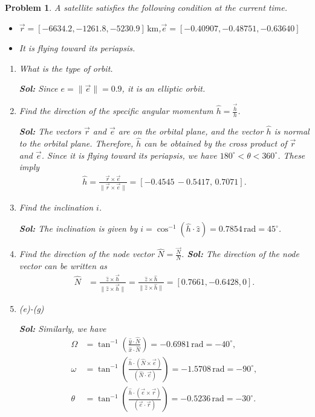\documentclass[10pt]{article}
\newcommand{\parenth}[1]{\ensuremath{\left( #1 \right)}}
\theoremstyle{plain}\theorembodyfont{\normalfont}
\newtheorem{prob}{Problem}[section]
\newenvironment{subprob}%
{\renewcommand{\theenumi}{\alph{enumi}}\renewcommand{\labelenumi}{(\theenumi)}\begin{enumerate}}%
{\end{enumerate}}%
\begin{document}
\newpage
\begin{prob} A satellite satisfies the following condition at the current time.
\begin{itemize}
\item $\vec r = [-6634.2, -1261.8, -5230.9]\,\mathrm{km}$,\quad $\vec e = [-0.40907, -0.48751, -0.63640]$
\item It is flying toward its periapsis.
\end{itemize}
\begin{subprob}
\item What is the type of orbit.

\textbf{Sol:} Since $e=\|\vec e\|= 0.9 $, it is an elliptic orbit.

\item Find the direction of the specific angular momentum $\hat h = \frac{\vec h}{h}$.

\textbf{Sol:} The vectors $\vec r$ and $\vec e$ are on the orbital plane, and the vector $\hat h$ is normal to the orbital plane. Therefore, $\hat h$ can be obtained by the cross product  of $\vec r$ and $\vec e$. Since it is flying toward its periapsis, we have $180^\circ < \theta <360^\circ$. These imply
\begin{align*}
\hat h = \frac{\vec r \times \vec e}{\|\vec r \times \vec e\|} = 
[-0.4545\,   -0.5417,\,    0.7071].
\end{align*}

\item Find the inclination $i$. %

\textbf{Sol:} The inclination is given by $i = \cos^{-1} (\hat h \cdot \hat z) = 0.7854\,\mathrm{rad}=45^\circ$.

\item Find the direction of the node vector $\hat N = \frac{\vec N}{N}$.
\textbf{Sol:} The direction of the node vector can be written as
\begin{align*}
\hat N & = \frac{\hat z \times \vec h}{\|\hat z \times \vec h\|} = 
\frac{\hat z \times \hat h}{\|\hat z \times \hat h\|} = [0.7661,   -0.6428,         0].
\end{align*}

\item[(e)-(g)]

\textbf{Sol:} Similarly, we have
\begin{align*}
\Omega & = \tan^{-1} \parenth{\frac{\hat y \cdot \hat N}{\hat x \cdot \hat N}}=-0.6981\,\mathrm{rad}=-40^\circ,\\
\omega & = \tan^{-1} \parenth{\frac{\hat h \cdot (\hat N \times \vec e)}{ (\hat N \cdot \vec e)}}=-1.5708\,\mathrm{rad}=-90^\circ,\\
\theta & = \tan^{-1} \parenth{\frac{\hat h \cdot (\vec e \times \vec r)}{ (\vec e \cdot \vec r)}}=-0.5236\,\mathrm{rad}=-30^\circ.
\end{align*}

\end{subprob}
\end{prob}
\end{document}
